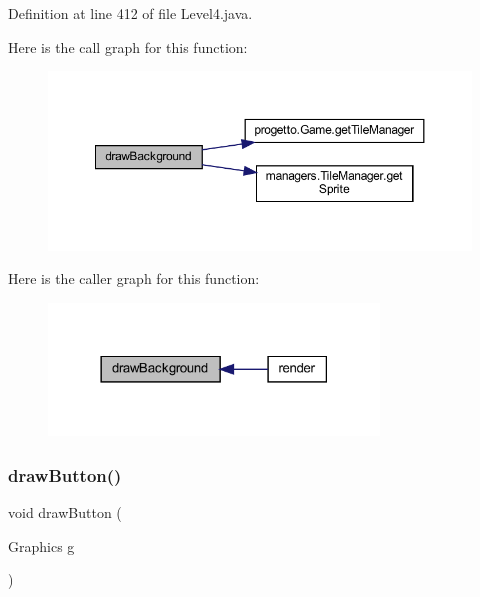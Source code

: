 Definition at line 412 of file Level4.\+java.

Here is the call graph for this function\+:\nopagebreak
\begin{figure}[H]
\begin{center}
\leavevmode
\includegraphics[width=350pt]{classscenes_1_1_level4_a62bcb07be9e39896e5837a9d396e7235_cgraph}
\end{center}
\end{figure}
Here is the caller graph for this function\+:\nopagebreak
\begin{figure}[H]
\begin{center}
\leavevmode
\includegraphics[width=249pt]{classscenes_1_1_level4_a62bcb07be9e39896e5837a9d396e7235_icgraph}
\end{center}
\end{figure}
\mbox{\label{classscenes_1_1_level4_a65768678909bc0512c6cb9780709ad38}} 
\subsubsection{\texorpdfstring{draw\+Button()}{drawButton()}}
{\footnotesize\ttfamily void draw\+Button (\begin{DoxyParamCaption}\item[{Graphics}]{g }\end{DoxyParamCaption})\hspace{0.3cm}{\ttfamily [private]}}



